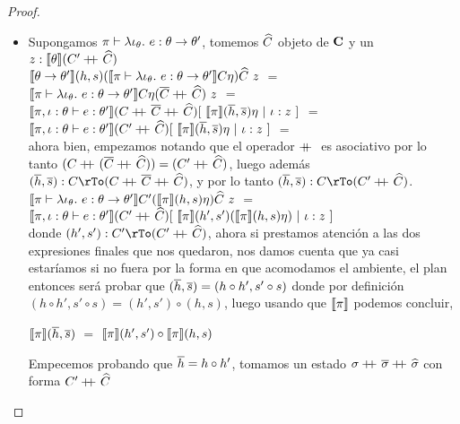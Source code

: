\begin{proof}
\begin{itemize}
\begin{itemize}
\item Supongamos $\pi \vdash \lambda \iota_{\theta} . \ e : \theta \rightarrow \theta'$, tomemos
$\widehat{C}$ objeto de $\textbf{C}$ y un $z : \llbracket \theta \rrbracket(C'+\kern-1.3ex+\kern0.8ex\widehat{C})$ \\

$\llbracket \theta \rightarrow \theta' \rrbracket(h,s)
(\llbracket \pi \vdash 
	\lambda \iota_{\theta} . \ e : \theta \rightarrow \theta' \rrbracket C \eta)\widehat{C} \ z$ $=$\\
$\llbracket \pi \vdash \lambda \iota_{\theta} . \ e : \theta \rightarrow \theta' \rrbracket C 
	\eta (\overline{C} +\kern-1.3ex+\kern0.8ex \widehat{C}) \ z$ $=$\\
$\llbracket \pi,\iota:\theta \vdash e : \theta' \rrbracket
	(C +\kern-1.3ex+\kern0.8ex \overline{C} +\kern-1.3ex+\kern0.8ex \widehat{C})
	[ \ \llbracket \pi \rrbracket(\overline{h},\overline{s})\eta \ | \ \iota:z \ ]$ $=$\\
$\llbracket \pi,\iota:\theta \vdash e : \theta' \rrbracket
	(C' +\kern-1.3ex+\kern0.8ex \widehat{C})
	[ \ \llbracket \pi \rrbracket(\overline{h},\overline{s})\eta \ | \ \iota:z \ ]$ $=$\\

ahora bien, empezamos notando que el operador $+\kern-1.3ex+\kern0.8ex$ es asociativo por lo tanto
$(C +\kern-1.3ex+\kern0.8ex (\overline{C} +\kern-1.3ex+\kern0.8ex \widehat{C})) = (C' +\kern-1.3ex+\kern0.8ex \widehat{C})$, luego adem\'as
$(\hover,\sover) : C \rTo (C \concat \Cover \concat \Chat)$, y por lo tanto
$(\hover,\sover) : C \rTo (C' \concat \Chat)$.\\

$\llbracket \pi \vdash \lambda \iota_{\theta} . \ e : \theta \rightarrow \theta' \rrbracket
		C'(\llbracket \pi \rrbracket(h,s)\eta)\widehat{C} \ z$ $=$\\
$\semBrcks{\pi,\iota:\theta \vdash e : \theta'}(C' \concat \Chat)
			[ \ \semBrcks{\pi}(h',s')(\semBrcks{\pi}(h,s)\eta) \ | \ \iota:z \ ]$\\

donde $(h',s') : C' \rTo (C' \concat \Chat)$,
ahora si prestamos atenci\'on a las dos expresiones finales que nos quedaron, nos 
damos cuenta que ya casi estar\'iamos si no fuera por la forma en que acomodamos
el ambiente, el plan entonces ser\'a probar que $(\overline{h},\overline{s}) = (h \circ h',s'\circ s)$
donde por definici\'on $(h \circ h',s'\circ s) = (h',s') \circ (h,s)$, luego usando
que $\llbracket \pi \rrbracket$ podemos concluir,

\begin{center}
$\llbracket \pi \rrbracket(\overline{h},\overline{s})$ $=$ $\llbracket \pi \rrbracket(h',s') \circ \llbracket \pi \rrbracket(h,s)$
\end{center}

Empecemos probando que $\overline{h} = h \circ h'$, tomamos un estado 
$\sigma +\kern-1.3ex+\kern0.8ex \overline{\sigma} +\kern-1.3ex+\kern0.8ex \widehat{\sigma}$ con forma $C' +\kern-1.3ex+\kern0.8ex \widehat{C}$\\


\end{itemize}
\end{itemize}
\end{proof}
